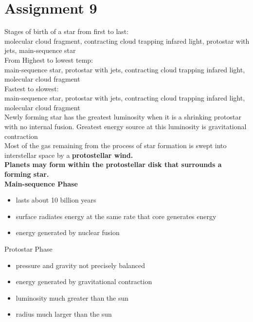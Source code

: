 \section{Assignment 9}
Stages of birth of a star from first to last:\\
molecular cloud fragment, contracting cloud trapping infared light, protostar with jets, main-sequence star\\

From Highest to lowest temp:\\
main-sequence star, protostar with jets, contracting cloud trapping infared light, molecular cloud fragment\\

Fastest to slowest:\\
main-sequence star, protostar with jets, contracting cloud trapping infared light, molecular cloud fragment\\

Newly forming star has the greatest luminosity when it is a shrinking protostar with no internal fusion. Greatest energy source at this luminosity is gravitational contraction\\

Most of the gas remaining from the process of star formation is swept into interstellar space by a \bf{protostellar wind}.\\

Planets may form within the protostellar disk that surrounds a forming star.\\

Main-sequence Phase
\begin{itemize}
\item lasts about 10 billion years
\item surface radiates energy at the same rate that core generates energy
\item energy generated by nuclear fusion
\end{itemize}

Protostar Phase
\begin{itemize}
\item pressure and gravity not precisely balanced
\item energy generated by gravitational contraction
\item luminosity much greater than the sun
\item radius much larger than the sun
\end{itemize}

